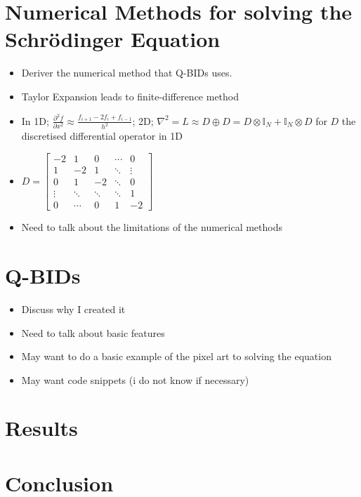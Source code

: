 \documentclass[12pt,a4paper]{amsart}
\newcommand{\pderiv}[3][]{%
  \frac{\partial^{#1} #2}{\partial #3^{#1}}%
}
\newcommand{\tridiag}[3]{%
  \begin{bmatrix}
    #1 & #2 & 0 & \cdots & 0 \\
    #3 & #1 & #2 & \ddots & \vdots \\
    0 & #3 & #1 & \ddots & 0 \\
    \vdots & \ddots & \ddots & \ddots & #2 \\
    0 & \cdots & 0 & #3 & #1
  \end{bmatrix}%
}
\newcommand{\Identity}[1]{\mathbb{I}_{#1}}
\begin{document}
\section*{Numerical Methods for solving the Schrödinger Equation}
\begin{itemize}
    \item Deriver the numerical method that Q-BIDs uses.
    \item Taylor Expansion leads to finite-difference method
    \item In 1D; $\pderiv[2]{f}{x} \approx \frac{f_{i+1} - 2f_{i} + f_{i-1}}{h^{2}}$; 2D; $\nabla^{2} = L \approx D \oplus D = D \otimes \Identity{N} + \Identity{N} \otimes D$ for $D$ the discretised differential operator in 1D
    \item $D = \tridiag{-2}{1}{1}$
    \item Need to talk about the limitations of the numerical methods
\end{itemize}

\section*{Q-BIDs}
\begin{itemize}
    \item Discuss why I created it
    \item Need to talk about basic features
    \item May want to do a basic example of the pixel art to solving the equation
    \item May want code snippets (i do not know if necessary)
\end{itemize}

\section*{Results}

\section*{Conclusion}
\end{document}

